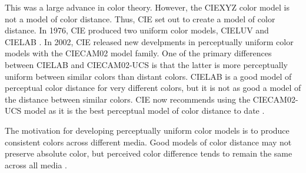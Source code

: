\documentclass[journal,12pt]{IEEEtran}
\begin{document}
This was a large advance in color theory. However, the CIEXYZ color model
is not a model of color distance. Thus, CIE set out to
create a model of color distance.
In 1976, CIE produced two uniform color models, CIELUV and CIELAB \cite{colorimetry}.
In 2002, CIE released new develpments in perceptually uniform color models with
the CIECAM02 model family.
One of the primary differences between CIELAB and CIECAM02-UCS is that the latter
is more perceptually uniform between similar colors than distant colors. CIELAB
is a good model of perceptual color distance for very different colors, but 
it is not as good a model of the distance between similar colors.
CIE now recommends using the CIECAM02-UCS model as it 
is the best perceptual model of color distance to date \cite{ciecam02}.

The motivation for developing perceptually
uniform color models is to produce consistent colors across different media.
Good models of color
distance may not preserve absolute color, but perceived color difference tends
to remain the same across all media \cite{ciecam02}.

\end{document}
